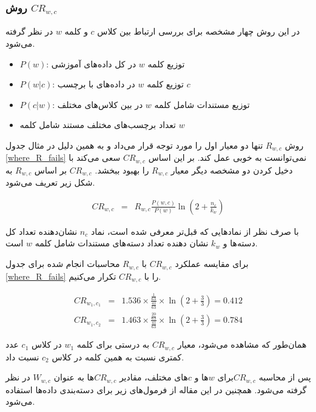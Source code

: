 \documentclass[12pt, a4paper]{article}
\begin{document}
\subsubsection*{روش $CR_{w, c}$}

در این روش چهار مشخصه برای بررسی
ارتباط بین کلاس $c$ و کلمه $w$ در نظر گرفته می‌شود.

\begin{itemize}
    \item $P(w)$: توزیع کلمه $w$ در کل داده‌های آموزشی
    \item $P(w|c)$: توزیع کلمه $w$ در داده‌های با برچسب $c$
    \item $P(c|w)$: توزیع مستندات شامل کلمه $w$ در بین کلاس‌های مختلف
    \item تعداد برچسب‌های مختلف مستند شامل کلمه $w$
\end{itemize}

روش $R_{w,c}$ تنها دو معیار اول را مورد توجه قرار می‌داد و
به همین دلیل در مثال جدول \ref{where_R_fails} نمی‌توانست به خوبی عمل کند.
بر این اساس $CR_{w,c}$ سعی می‌کند با دخیل کردن دو مشخصه دیگر معیار $R_{w,c}$
را بهبود ببخشد. $CR_{w,c}$ بر اساس $R_{w,c}$ به شکل زیر تعریف می‌شود.

\begin{eqnarray}
    CR_{w, c} & = & R_{w, c} \frac{P(w, c)}{P(w)} \ln(2 + \frac{n_c}{k_w})
\end{eqnarray}

با صرف نظر از نماد‌هایی که قبل‌تر معرفی شده است، نماد $n_c$ نشان‌دهنده تعداد کل
دسته‌ها و $k_w$ نشان دهنده تعداد دسته‌های مستندات شامل کلمه $w$ است.

برای مقایسه عملکرد $CR_{w,c}$ با $R_{w,c}$ محاسبات انجام شده برای جدول \ref{where_R_fails}
را با $CR_{w,c}$ تکرار می‌کنیم.

\begin{eqnarray}
    CR_{w_1, c_1} & = & 1.536 \times \frac{\frac{1}{63}}{\frac{41}{63}} \times \ln(2+\frac{3}{3}) = 0.412 \\
    CR_{w_1, c_2} & = & 1.463 \times \frac{\frac{20}{63}}{\frac{41}{63}} \times \ln(2+\frac{3}{3}) = 0.784
\end{eqnarray}

همان‌طور که مشاهده می‌شود، معیار $CR_{w,c}$ به درستی برای کلمه $w_1$ در کلاس $c_1$
عدد کمتری نسبت به همین کلمه در کلاس $c_2$ نسبت داد.

پس از محاسبه $CR_{w,c}$برای $w$ها و $c$های مختلف، مقادیر $CR_{w,c}$ها به
عنوان $W_{w,c}$ در نظر گرفته می‌شود. همچنین در این مقاله از فرمول‌های زیر
برای دسته‌بندی داده‌ها استفاده می‌شود.
\end{document}
